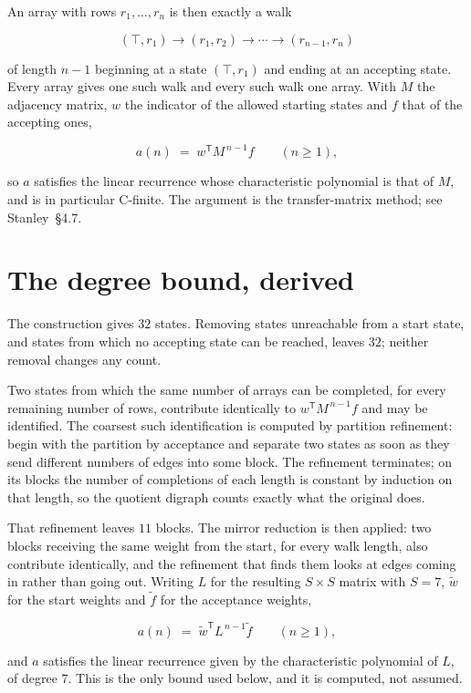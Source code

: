 \documentclass[11pt]{article}
\theoremstyle{definition}
\begin{document}
An array with rows $r_1,\dots,r_n$ is then exactly a walk

\[(\top,r_1) \to (r_1,r_2) \to \cdots \to (r_{n-1},r_n)\]

of length $n-1$ beginning at a state $(\top,r_1)$ and ending at an accepting state. Every array gives one such walk and every such walk one array. With $M$ the adjacency matrix, $w$ the indicator of the allowed starting states and $f$ that of the accepting ones,

\[a(n) \;=\; w^{\mathsf T} M^{\,n-1} f \qquad (n \ge 1),\]

so $a$ satisfies the linear recurrence whose characteristic polynomial is that of $M$, and is in particular C-finite. The argument is the transfer-matrix method; see Stanley~\S4.7.

\section{The degree bound, derived}

The construction gives $32$ states. Removing states unreachable from a start state, and states from which no accepting state can be reached, leaves $32$; neither removal changes any count.

Two states from which the same number of arrays can be completed, for every remaining number of rows, contribute identically to $w^{\mathsf T}M^{\,n-1}f$ and may be identified. The coarsest such identification is computed by partition refinement: begin with the partition by acceptance and separate two states as soon as they send different numbers of edges into some block. The refinement terminates; on its blocks the number of completions of each length is constant by induction on that length, so the quotient digraph counts exactly what the original does.

That refinement leaves $11$ blocks. The mirror reduction is then applied: two blocks receiving the same weight from the start, for every walk length, also contribute identically, and the refinement that finds them looks at edges coming in rather than going out. Writing $L$ for the resulting $S \times S$ matrix with $S = 7$, $\tilde w$ for the start weights and $\tilde f$ for the acceptance weights,

\[a(n) \;=\; \tilde w^{\mathsf T} L^{\,n-1} \tilde f \qquad (n \ge 1),\]

and $a$ satisfies the linear recurrence given by the characteristic polynomial of $L$, of degree $7$. This is the only bound used below, and it is computed, not assumed.
\end{document}
